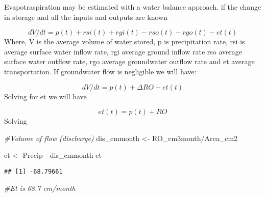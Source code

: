 \documentclass[
]{article}
\newenvironment{Shaded}{\begin{snugshade}}{\end{snugshade}}
\newcommand{\CommentTok}[1]{\textcolor[rgb]{0.56,0.35,0.01}{\textit{#1}}}
\newcommand{\NormalTok}[1]{#1}
\newcommand{\OtherTok}[1]{\textcolor[rgb]{0.56,0.35,0.01}{#1}}
\newcommand{\SpecialCharTok}[1]{\textcolor[rgb]{0.00,0.00,0.00}{#1}}
\begin{document}
Evapotraspiration may be estimated with a water balance approach. if the
change in storage and all the inputs and outputs are known

\[ dV/dt = p(t) + rsi(t) + rgi(t) - rso(t) - rgo(t) - et(t)\] Where, V
is the average volume of water stored, p is precipitation rate, rsi is
average surface water inflow rate, rgi average ground inflow rate rso
average surface water outflow rate, rgo average groundwater outflow rate
and et average transportation. If groundwater flow is negligible we will
have:

\[ dV/dt = p(t) + ΔRO- et(t) \] Solving for et we will have

\[ et(t) = p(t) + RO \] Solving

\begin{Shaded}
\begin{Highlighting}[]
\CommentTok{\#Volume of flow (discharge) }
\NormalTok{dis\_cmmonth }\OtherTok{\textless{}{-}}\NormalTok{ RO\_cm3month}\SpecialCharTok{/}\NormalTok{Area\_cm2}

\NormalTok{et }\OtherTok{\textless{}{-}}\NormalTok{ Precip }\SpecialCharTok{{-}}\NormalTok{ dis\_cmmonth }
\NormalTok{et }
\end{Highlighting}
\end{Shaded}

\begin{verbatim}
## [1] -68.79661
\end{verbatim}

\begin{Shaded}
\begin{Highlighting}[]
\CommentTok{\#Et is 68.7 cm/month}
\end{Highlighting}
\end{Shaded}
\end{document}
